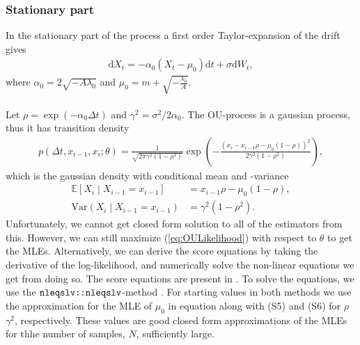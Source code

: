 \subsubsection{Stationary part}\label{subsubsec:OUprocessStationary}
In the stationary part of the process a first order Taylor-expansion of the drift gives 
\begin{align}
    \mathrm{d}X_t = -\alpha_0\left(X_t-\mu_0\right) \mathrm{d}t + \sigma \mathrm{d}W_t,
\end{align}
where $\alpha_0 = 2\sqrt{-A\lambda_0}$ and $\mu_0 = m + \sqrt{-\frac{\lambda_0}{A}}$.\\\\
Let $\rho = \exp\left(-\alpha_0\Delta t\right)$ and $\gamma^2 = \sigma^2/2\alpha_0$. The OU-process is a gaussian process, thus it has transition density \cite[equation (S3)]{DitlevsenSupplementary}
\begin{align}
    p\left(\Delta t, x_{i-1}, x_i;\theta\right) = \frac{1}{\sqrt{2\pi\gamma^2\left(1-\rho^2\right)}}\exp\left(-\frac{\left(x_i-x_{i-1}\rho - \mu_0\left(1-\rho\right)\right)^2}{2\gamma^2\left(1-\rho^2\right)}\right), \label{eq:OULikelihood}
\end{align}
which is the gaussian density with conditional mean and -variance
\begin{align}
    \mathbb{E}\left[X_i\middle|X_{i-1} = x_{i-1}\right] &= x_{i - 1}\rho - \mu_0\left(1-\rho\right),\\
    \mathrm{Var}\left(X_i\middle|X_{i-1} = x_{i-1}\right) &= \gamma^2\left(1-\rho^2\right).
\end{align}
Unfortunately, we cannot get closed form solution to all of the estimators from this. However, we can still maximize (\ref{eq:OULikelihood}) with respect to $\theta$ to get the MLEs. Alternatively, we can derive the score equations by taking the derivative of the log-likelihood, and numerically solve the non-linear equations we get from doing so. The score equations are present in \cite[p.1, bottom]{DitlevsenSupplementary}. To solve the equations, we use the $\texttt{nleqslv::nleqslv}$-method \cite{nleqslv}. For starting values in both methods we use the approximation for the MLE of $\mu_0$ in equation \cite[(S4)]{DitlevsenSupplementary} along with (S5) and (S6) for $\rho$ $\gamma^2$, respectively. These values are good closed form approximations of the MLEs for thhe number of samples, $N$, sufficiently large.
